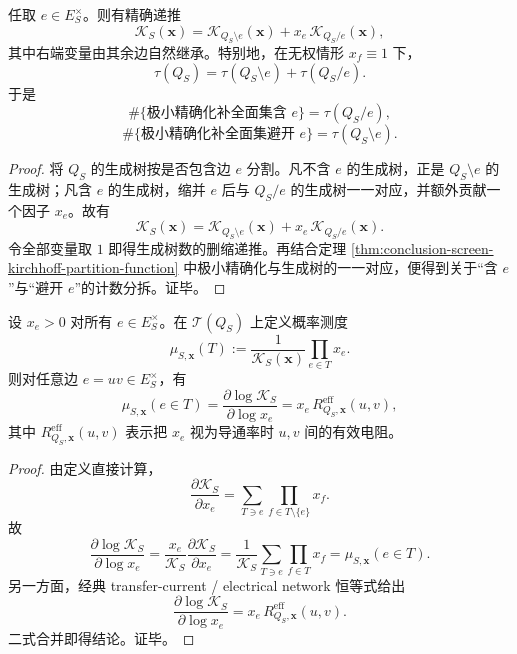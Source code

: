 \begin{theorem}[极小精确化计数的删缩递推]\label{thm:conclusion-screen-kirchhoff-deletion-contraction}
任取 \(e\in E_S^\times\)。则有精确递推
\[
\mathcal K_S(\mathbf x)
=
\mathcal K_{Q_S\setminus e}(\mathbf x)
+
x_e\,\mathcal K_{Q_S/e}(\mathbf x),
\]
其中右端变量由其余边自然继承。特别地，在无权情形 \(x_f\equiv 1\) 下，
\[
\tau(Q_S)=\tau(Q_S\setminus e)+\tau(Q_S/e).
\]
于是
\[
\#\{\text{极小精确化补全面集含 }e\}
=
\tau(Q_S/e),
\]
\[
\#\{\text{极小精确化补全面集避开 }e\}
=
\tau(Q_S\setminus e).
\]
\end{theorem}
\begin{proof}
将 \(Q_S\) 的生成树按是否包含边 \(e\) 分割。凡不含 \(e\) 的生成树，正是 \(Q_S\setminus e\) 的生成树；凡含 \(e\) 的生成树，缩并 \(e\) 后与 \(Q_S/e\) 的生成树一一对应，并额外贡献一个因子 \(x_e\)。故有
\[
\mathcal K_S(\mathbf x)
=
\mathcal K_{Q_S\setminus e}(\mathbf x)
+
x_e\,\mathcal K_{Q_S/e}(\mathbf x).
\]
令全部变量取 \(1\) 即得生成树数的删缩递推。再结合定理 \ref{thm:conclusion-screen-kirchhoff-partition-function} 中极小精确化与生成树的一一对应，便得到关于“含 \(e\)”与“避开 \(e\)”的计数分拆。证毕。
\end{proof}

\begin{theorem}\label{thm:conclusion-screen-kirchhoff-gibbs-edge-occupation}
设 \(x_e>0\) 对所有 \(e\in E_S^\times\)。在 \(\mathcal T(Q_S)\) 上定义概率测度
\[
\mu_{S,\mathbf x}(T)
:=
\frac{1}{\mathcal K_S(\mathbf x)}
\prod_{e\in T}x_e.
\]
则对任意边 \(e=uv\in E_S^\times\)，有
\[
\mu_{S,\mathbf x}(e\in T)
=
\frac{\partial \log \mathcal K_S}{\partial \log x_e}
=
x_e\,R^{\mathrm{eff}}_{Q_S,\mathbf x}(u,v),
\]
其中 \(R^{\mathrm{eff}}_{Q_S,\mathbf x}(u,v)\) 表示把 \(x_e\) 视为导通率时 \(u,v\) 间的有效电阻。
\end{theorem}
\begin{proof}
由定义直接计算，
\[
\frac{\partial \mathcal K_S}{\partial x_e}
=
\sum_{T\ni e}\prod_{f\in T\setminus\{e\}}x_f.
\]
故
\[
\frac{\partial \log \mathcal K_S}{\partial \log x_e}
=
\frac{x_e}{\mathcal K_S}\frac{\partial \mathcal K_S}{\partial x_e}
=
\frac1{\mathcal K_S}
\sum_{T\ni e}\prod_{f\in T}x_f
=
\mu_{S,\mathbf x}(e\in T).
\]
另一方面，经典 transfer-current / electrical network 恒等式给出
\[
\frac{\partial \log \mathcal K_S}{\partial \log x_e}
=
x_e\,R^{\mathrm{eff}}_{Q_S,\mathbf x}(u,v).
\]
二式合并即得结论。证毕。
\end{proof}

